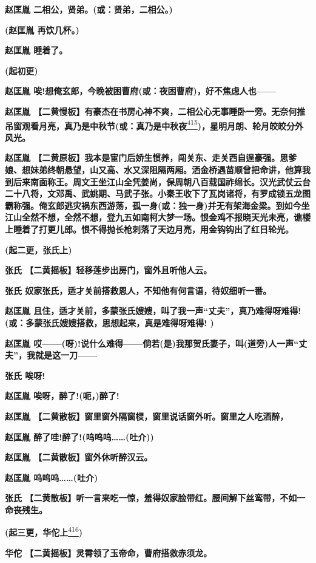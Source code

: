 \textbf{赵匡胤 二相公，贤弟。(或：贤弟，二相公。)}

\textbf{(赵匡胤 再饮几杯。)}

\textbf{赵匡胤 睡着了。}

\textbf{(起初更)}

\textbf{赵匡胤
唉!想俺玄郎，今晚被困曹府(或：夜困曹府)，好不焦虑人也------}

\textbf{赵匡胤
【二黄慢板】有豪杰在书房心神不爽，二相公心无事睡卧一旁。无奈何推吊窗观看月亮，真乃是中秋节(或：真乃是中秋夜}\protect\hyperlink{fn415}{\textsuperscript{415}}\textbf{)，星明月朗、轮月皎皎分外风光。}

\textbf{赵匡胤
【二黄原板】我本是宦门后娇生惯养，闯关东、走关西自逞豪强。思爹娘、想妹弟终朝悬望，山又高、水又深阻隔两厢。洒金桥遇苗顺曾把命讲，他算我到后来南面称王。周文王坐江山全凭姜尚，保周朝八百载国祚绵长。汉光武仗云台二十八将，文邓禹、武姚期、马武子张。小秦王收下了瓦岗诸将，有罗成锁五龙图霸称强。俺玄郎逃灾祸东西游荡，孤一身(或：独一身)并无有架海金梁。到如今坐江山全然不想，全然不想，登九五如南柯大梦一场。恨金鸡不报晓天光未亮，谯楼上睡着了打更儿郎。恨不得抛长枪刺落了天边月亮，用金钩钩出了红日轮光。}

\textbf{(起二更，张氏上)}

\textbf{张氏 【二黄摇板】轻移莲步出房门，窗外且听他人云。}

\textbf{张氏 奴家张氏，适才关前搭救恩人，不知他有何言语，待奴细听一番。}

\textbf{赵匡胤
且住，适才关前，多蒙张氏嫂嫂，叫了我一声``丈夫''，真乃难得呀难得!(或：多蒙张氏嫂嫂搭救，思想起来，真是难得呀难得!
)}

\textbf{赵匡胤
哎------(呀)!说什么难得------倘若(是)我那贺氏妻子，叫(道旁)人一声``丈夫''，我就是这一刀------}

\textbf{张氏 唉呀!}

\textbf{赵匡胤 唉呀，醉了!(呃，)醉了!}

\textbf{赵匡胤
【二黄散板】窗里窗外隔窗棂，窗里说话窗外听。窗里之人吃酒醉，}

\textbf{赵匡胤 醉了哇!醉了!(呜呜呜\ldots{}\ldots{}(吐介))}

\textbf{赵匡胤 【二黄散板】窗外休听醉汉云。}

\textbf{赵匡胤 呜呜呜\ldots{}\ldots{}(吐介)}

\textbf{张氏
【二黄散板】听一言来吃一惊，羞得奴家脸带红。腰间解下丝鸾带，不如一命丧残生。}

\textbf{(起三更，华佗上}\protect\hyperlink{fn416}{\textsuperscript{416}}\textbf{)}

\textbf{华佗 【二黄摇板】灵霄领了玉帝命，曹府搭救赤须龙。}


